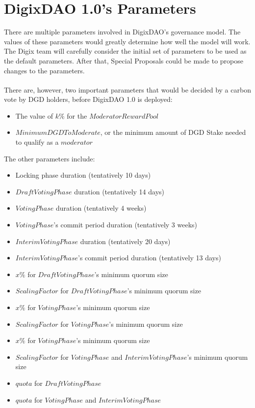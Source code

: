 \documentclass[11pt,a4paper,titlepage]{article}
\begin{document}
\section{DigixDAO 1.0's Parameters}{
	There are multiple parameters involved in DigixDAO's governance model. The values of these parameters would greatly determine how well the model will work. The Digix team will carefully consider the initial set of parameters to be used as the default parameters. After that, Special Proposals could be made to propose changes to the parameters.\\
	\\
	There are, however, two important parameters that would be decided by a carbon vote by DGD holders, before DigixDAO 1.0 is deployed:
	\begin{itemize}
		\item The value of $k\%$ for the $ModeratorRewardPool$
		\item $MinimumDGDToModerate$, or the minimum amount of DGD Stake needed to qualify as a $moderator$
	\end{itemize}
	The other parameters include:
	\begin{itemize}
		\item Locking phase duration (tentatively 10 days)
		\item $Draft Voting Phase$ duration (tentatively 14 days)
		\item $Voting Phase$ duration (tentatively 4 weeks)
		\item $Voting Phase$'s commit period duration (tentatively 3 weeks)
		\item $Interim Voting Phase$ duration (tentatively 20 days)
		\item $Interim Voting Phase$'s commit period duration (tentatively 13 days)
		\item $x\%$ for $Draft Voting Phase$'s minimum quorum size
		\item $ScalingFactor$ for $Draft Voting Phase$'s minimum quorum size
		\item $x\%$ for $Voting Phase$'s minimum quorum size
		\item $ScalingFactor$ for $Voting Phase$'s minimum quorum size
		\item $x\%$ for $Voting Phase$'s minimum quorum size
		\item $ScalingFactor$ for $Voting Phase$ and $Interim Voting Phase$'s minimum quorum size
		\item $quota$ for $Draft Voting Phase$
		\item $quota$ for $Voting Phase$ and $Interim Voting Phase$

\end{itemize}}
\end{document}
